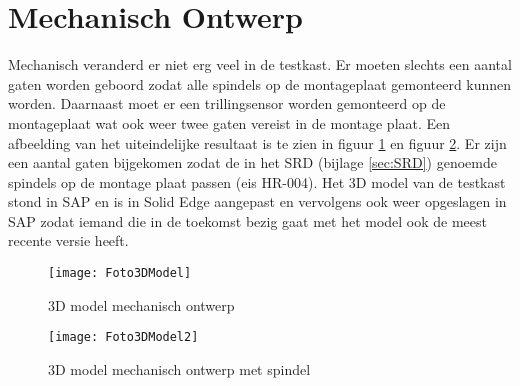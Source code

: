\section{Mechanisch Ontwerp}

Mechanisch veranderd er niet erg veel in de testkast. Er moeten slechts een aantal gaten worden geboord zodat alle spindels op de montageplaat gemonteerd kunnen worden. Daarnaast moet er een trillingsensor worden gemonteerd op de montageplaat wat ook weer twee gaten vereist in de montage plaat. Een afbeelding van het uiteindelijke resultaat is te zien in figuur \ref{fig:MechanischOntwerp} en figuur \ref{fig:MechanischOntwerp2}. Er zijn een aantal gaten bijgekomen zodat de in het \gls{SRD} (bijlage \ref{sec:SRD}) genoemde spindels op de montage plaat passen (eis HR-004). Het 3D model van de testkast stond in \gls{SAP} en is in Solid Edge aangepast en vervolgens ook weer opgeslagen in \gls{SAP} zodat iemand die in de toekomst bezig gaat met het model ook de meest recente versie heeft.

\begin{figure}[H]
	\centering
	\texttt{[image: Foto3DModel]}
	\caption{3D model mechanisch ontwerp}
	\label{fig:MechanischOntwerp}
\end{figure}

\begin{figure}[H]
	\centering
	\texttt{[image: Foto3DModel2]}
	\caption{3D model mechanisch ontwerp met spindel}
	\label{fig:MechanischOntwerp2}
\end{figure}